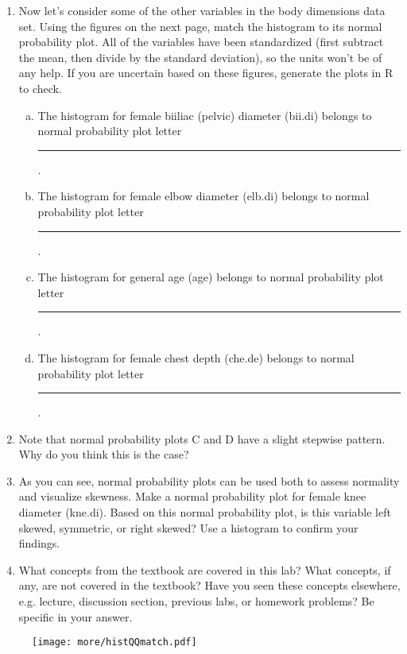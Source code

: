 \documentclass{article}\usepackage[]{graphicx}\usepackage[]{color}
\newcommand{\hlstd}[1]{\textcolor[rgb]{0.345,0.345,0.345}{#1}}%
\begin{document}
\begin{enumerate}

\item Now let's consider some of the other variables in the body dimensions data set.  Using the figures on the next page, match the histogram to its normal probability plot.  All of the variables have been standardized (first subtract the mean, then divide by the standard deviation), so the units won't be of any help.  If you are uncertain based on these figures, generate the plots in R to check.

\begin{enumerate}[(a)]

\item The histogram for female biiliac (pelvic) diameter (\hlstd{bii.di}) belongs to normal probability plot letter \rule{0.25in}{1pt}.

\item The histogram for female elbow diameter (\hlstd{elb.di}) belongs to normal probability plot letter \rule{0.25in}{1pt}.

\item The histogram for general age (\hlstd{age}) belongs to normal probability plot letter \rule{0.25in}{1pt}.

\item The histogram for female chest depth (\hlstd{che.de}) belongs to normal probability plot letter \rule{0.25in}{1pt}.

\end{enumerate}

\item Note that normal probability plots C and D have a slight stepwise pattern.  Why do you think this is the case?

\item As you can see, normal probability plots can be used both to assess normality and visualize skewness.  Make a normal probability plot for female knee diameter (\hlstd{kne.di}).  Based on this normal probability plot, is this variable left skewed, symmetric, or right skewed?  Use a histogram to confirm your findings.

\item What concepts from the textbook are covered in this lab?  What concepts, if any, are not covered in the textbook?  Have you seen these concepts elsewhere, e.g. lecture, discussion section, previous labs, or homework problems?  Be specific in your answer.

\end{enumerate}

\newpage

\begin{figure}[h]
   \centering
  \texttt{[image: more/histQQmatch.pdf]}
\end{figure}
\end{document}
